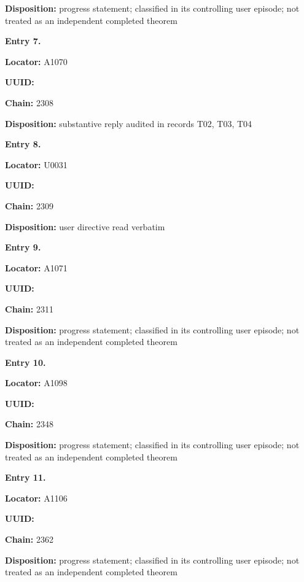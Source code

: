 \documentclass[10pt,a4paper,oneside]{report}
\begin{document}
\textbf{Disposition:} progress statement; classified in its controlling
user episode; not treated as an independent completed theorem


\textbf{Entry 7.}

\textbf{Locator:} A1070

\textbf{UUID:} \protect{}

\textbf{Chain:} 2308

\textbf{Disposition:} substantive reply audited in records T02, T03, T04


\textbf{Entry 8.}

\textbf{Locator:} U0031

\textbf{UUID:} \protect{}

\textbf{Chain:} 2309

\textbf{Disposition:} user directive read verbatim


\textbf{Entry 9.}

\textbf{Locator:} A1071

\textbf{UUID:} \protect{}

\textbf{Chain:} 2311

\textbf{Disposition:} progress statement; classified in its controlling
user episode; not treated as an independent completed theorem


\textbf{Entry 10.}

\textbf{Locator:} A1098

\textbf{UUID:} \protect{}

\textbf{Chain:} 2348

\textbf{Disposition:} progress statement; classified in its controlling
user episode; not treated as an independent completed theorem


\textbf{Entry 11.}

\textbf{Locator:} A1106

\textbf{UUID:} \protect{}

\textbf{Chain:} 2362

\textbf{Disposition:} progress statement; classified in its controlling
user episode; not treated as an independent completed theorem
\end{document}
